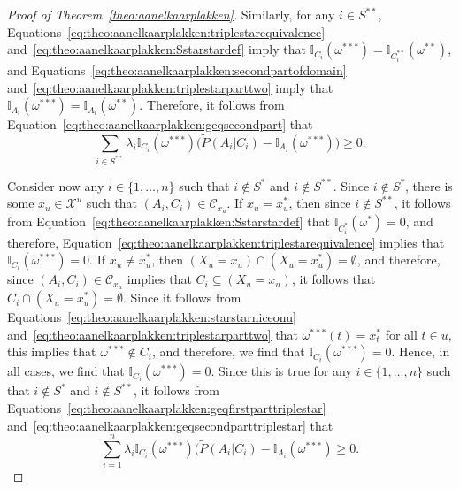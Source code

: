 \documentclass[10pt,a4paper]{paper}
\theoremstyle{definition}
\newcommand{\states}{\mathcal{X}}
\newcommand{\ind}[1]{\mathbb{I}_{#1}}
\begin{document}
\begin{proof}[Proof of Theorem~\ref{theo:aanelkaarplakken}]
Similarly, for any $i\in S^{**}$, 
Equations~\eqref{eq:theo:aanelkaarplakken:triplestarequivalence} and~\eqref{eq:theo:aanelkaarplakken:Sstarstardef} imply that $\ind{C_i}(\omega^{***})=\ind{C_i^{**}}(\omega^{**})$,
and Equations~\eqref{eq:theo:aanelkaarplakken:secondpartofdomain} and~\eqref{eq:theo:aanelkaarplakken:triplestarparttwo} imply that $\ind{A_i}(\omega^{***})=\ind{A_i}(\omega^{**})$. Therefore, it follows from Equation~\eqref{eq:theo:aanelkaarplakken:geqsecondpart} that
\begin{equation}\label{eq:theo:aanelkaarplakken:geqsecondparttriplestar}
\sum_{i\in S^{**}}\lambda_i\ind{C_i}(\omega^{***})\bigl(\tilde{P}(A_i\vert C_i)-\ind{A_i}(\omega^{***})\bigr)
\geq0.
\end{equation}

Consider now any $i\in\{1,\dots,n\}$ such that $i\notin S^*$ and $i\notin S^{**}$. Since $i\notin S^*$, there is some $x_u\in\states^u$ such that $(A_i,C_i)\in\mathcal{C}_{x_u}$. If $x_u= x_u^*$, then since $i\notin S^{**}$, it follows from Equation~\eqref{eq:theo:aanelkaarplakken:Sstarstardef} that $\ind{C_i^*}(\omega^*)=0$, and therefore, Equation~\eqref{eq:theo:aanelkaarplakken:triplestarequivalence} implies that $\ind{C_i}(\omega^{***})=0$. 
If $x_u\neq x_u^*$, then $(X_u=x_u)\cap(X_u=x_u^*)=\emptyset$, and therefore, since $(A_i,C_i)\in\mathcal{C}_{x_u}$ implies that $C_i\subseteq (X_u=x_u)$, it follows that $C_i\cap (X_u=x_u^*)=\emptyset$. Since it follows from Equations~\eqref{eq:theo:aanelkaarplakken:starstarniceonu} and~\eqref{eq:theo:aanelkaarplakken:triplestarparttwo} that $\omega^{***}(t)=x_t^*$ for all $t\in u$, this implies that $\omega^{***}\notin C_i$, and therefore, we find that $\ind{C_i}(\omega^{***})=0$.
Hence, in all cases, we find that $\ind{C_i}(\omega^{***})=0$. Since this is true for any $i\in\{1,\dots,n\}$ such that $i\notin S^*$ and $i\notin S^{**}$, it follows from Equations~\eqref{eq:theo:aanelkaarplakken:geqfirstparttriplestar} and~\eqref{eq:theo:aanelkaarplakken:geqsecondparttriplestar} that
\begin{equation}\label{eq:theo:aanelkaarplakken:geqtotal}
\sum_{i=1}^n\lambda_i\ind{C_i}(\omega^{***})\bigl(\tilde{P}(A_i\vert C_i)-\ind{A_i}(\omega^{***})\geq0.
\end{equation}


\end{proof}
\end{document}
